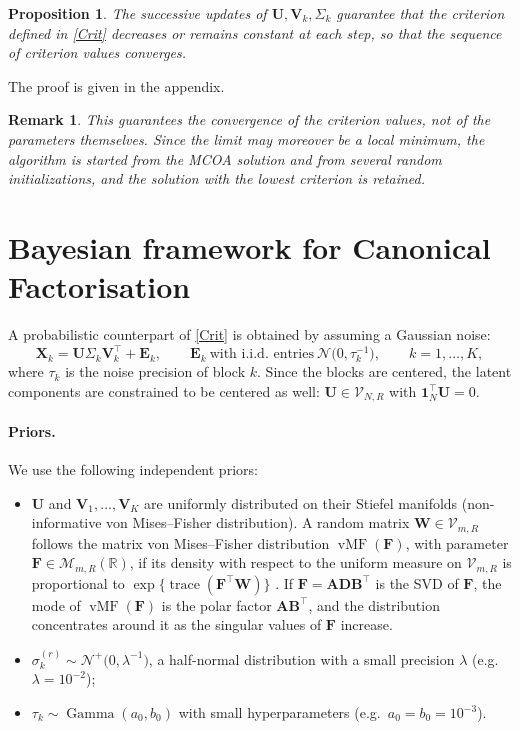 \documentclass[11pt]{article}
\newtheorem{proposition}{Proposition}
\newtheorem{remark}{Remark}
\DeclareMathOperator{\trace}{\mathrm{trace}}
\DeclareMathOperator{\vMF}{vMF}
\DeclareMathOperator{\Ga}{Gamma}
\newcommand{\X}{\mathbf{X}}
\newcommand{\U}{\mathbf{U}}
\newcommand{\V}{\mathbf{V}}
\newcommand{\EE}{\mathbf{E}}
\newcommand{\F}{\mathbf{F}}
\newcommand{\W}{\mathbf{W}}
\newcommand{\one}{\mathbf{1}}
\newcommand{\Stiefel}[2]{\mathcal V_{#1,#2}}
\begin{document}
\begin{proposition}
  The successive updates of $\U,\V_k,\Sigma_k$ guarantee that the criterion defined in \eqref{Crit} decreases or remains constant at each step, so that the sequence of criterion values converges.  
\end{proposition}
The proof is given in the appendix.
\begin{remark}
This guarantees the convergence of the criterion values, not of the parameters themselves. Since the limit may moreover be a local minimum, the algorithm is started from the MCOA solution and from several random initializations, and the solution with the lowest criterion is retained.  
\end{remark}



\section{Bayesian framework for Canonical Factorisation}

A probabilistic counterpart of \eqref{Crit} is obtained by assuming a Gaussian noise:
\begin{equation}
  \X_k=\U\Sigma_k\V_k^\intercal+\EE_k,\qquad
  \EE_k\ \text{with i.i.d. entries}\ \mathcal N\bigl(0,\tau_k^{-1}\bigr),\qquad k=1,\ldots,K,
  \label{eq:model}
\end{equation}
where $\tau_k$ is the noise precision of block $k$. Since the blocks are centered, the latent components are constrained to be
centered as well: $\U\in\Stiefel{N}{R}$ with $\one_N^\intercal\U=0$.

\paragraph{Priors.} We use the following independent priors:
\begin{itemize}
  \item $\U$ and $\V_1,\ldots,\V_K$ are uniformly distributed on their Stiefel manifolds (non-informative von Mises--Fisher distribution). A random matrix $\W\in\Stiefel{m}{R}$ follows the matrix von Mises--Fisher distribution $\vMF(\F)$, with parameter $\F\in\mathcal M_{m,R}(\mathbb R)$, if its density with
respect to the uniform measure on $\Stiefel{m}{R}$ is proportional to $\exp\{\trace(\F^\intercal\W)\}$
\cite{hoff2009}. If $\F=\mathbf A\mathbf D\mathbf B^\intercal$ is the SVD of $\F$, the mode of $\vMF(\F)$ is the
polar factor $\mathbf A\mathbf B^\intercal$, and the distribution concentrates around it as the singular values of $\F$ increase.
  \item $\sigma_k^{(r)}\sim\mathcal N^+\bigl(0,\lambda^{-1}\bigr)$, a half-normal distribution with a small precision
        $\lambda$ (e.g.\ $\lambda=10^{-2}$); 
  \item $\tau_k\sim\Ga(a_0,b_0)$ with small hyperparameters (e.g.\ $a_0=b_0=10^{-3}$).
\end{itemize}
\end{document}
